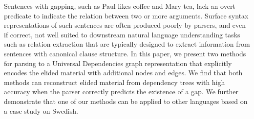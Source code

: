 Sentences with gapping, such as Paul likes coffee and Mary tea, lack an overt predicate to indicate the relation between two or more arguments. Surface syntax representations of such sentences are often produced poorly by parsers, and even if correct, not well suited to downstream natural language understanding tasks such as relation extraction that are typically designed to extract information from sentences with canonical clause structure. In this paper, we present two methods for parsing to a Universal Dependencies graph representation that explicitly encodes the elided material with additional nodes and edges. We find that both methods can reconstruct elided material from dependency trees with high accuracy when the parser correctly predicts the existence of a gap. We further demonstrate that one of our methods can be applied to other languages based on a case study on Swedish.
